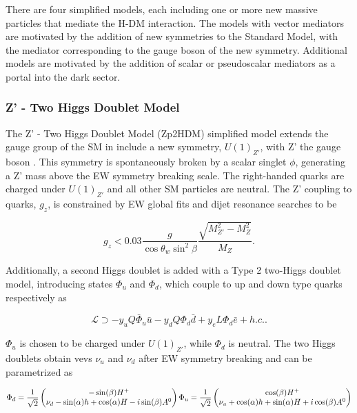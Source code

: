 \indent There are four simplified models, each including one or more new massive particles that mediate the H-DM interaction. The models with vector mediators are motivated by the addition of new symmetries to the Standard Model, with the mediator corresponding to the gauge boson of the new symmetry. Additional models are motivated by the addition of scalar or pseudoscalar mediators as a portal into the dark sector.

\subsubsection{Z' - Two Higgs Doublet Model}

The Z' - Two Higgs Doublet Model (Zp2HDM) simplified model extends the gauge group of the SM in include a new symmetry, $U(1)_{Z'}$, with Z' the gauge boson \cite{Berlin:2014cfa}. This symmetry is spontaneously broken by a scalar singlet $\phi$, generating a Z' mass above the EW symmetry breaking scale. The right-handed quarks are charged under $U(1)_{Z'}$ and all other SM particles are neutral. The Z' coupling to quarks, $g_z$, is constrained by EW global fits \cite{PhysRevD.86.010001} and dijet resonance searches \cite{Aaltonen:2008dn, Chatrchyan:2013qha} to be

\begin{equation}
g_z < 0.03 \frac{g}{\cos\theta_w\sin^2\beta}\frac{\sqrt{M_{Z'}^2-M_Z^2}}{M_Z}.
\end{equation}

Additionally, a second Higgs doublet is added with a Type 2 two-Higgs doublet model, introducing states $\Phi_u$ and $\Phi_d$, which couple to up and down type quarks respectively as

\begin{equation}
\mathcal{L} \supset -y_u Q \bar{\Phi}_u \bar{u} - y_d Q \Phi_d \bar{d} + y_e L \Phi_d \bar{e} + h.c..
\end{equation}

$\Phi_u$ is chosen to be charged under $U(1)_{Z'}$, while $\Phi_d$ is neutral. The two Higgs doublets obtain vevs $\nu_u$ and $\nu_d$ after EW symmetry breaking and can be parametrized as

\begin{equation}
\Phi_d = \frac{1}{\sqrt{2}} \begin{pmatrix}-\sin(\beta) H^{+} \\ \nu_d - \sin(\alpha)h + \cos(\alpha)H - i\sin(\beta)A^0 \end{pmatrix} \\
\Phi_u = \frac{1}{\sqrt{2}} \begin{pmatrix} \cos(\beta)H^{+} \\  \nu_u + \cos(\alpha)h + \sin(\alpha)H + i\cos(\beta)A^0 \end{pmatrix}
\end{equation}

